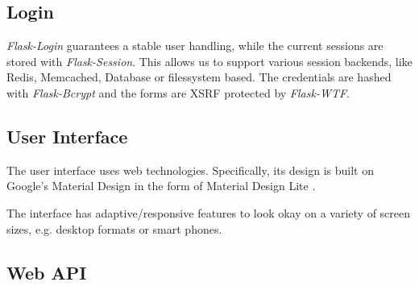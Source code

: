 \subsection{Login}
\label{gXLII:sec:implementation:login}  %
\textit{Flask-Login} guarantees a stable user handling, while the current sessions are stored with \textit{Flask-Session}. This allows us to support various session backends, like Redis, Memcached, Database or filessystem based. The credentials are hashed with \textit{Flask-Bcrypt} and the forms are XSRF protected by \textit{Flask-WTF}. 


\subsection{User Interface}
\label{gXLII:sec:implementation:UI}  %

The user interface uses web technologies. Specifically, its design is built on Google's Material Design in the form of Material Design Lite .

The interface has adaptive/responsive features to look okay on a variety of screen sizes, e.g. desktop formats or smart phones. 

\subsection{Web API}
\label{gXLII:sec:implementation:API}  %




